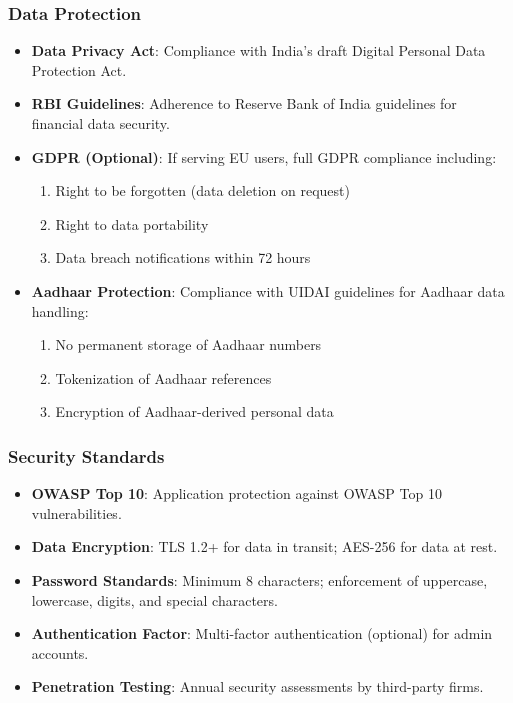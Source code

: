 \subsubsection{Data Protection}
\begin{itemize}
    \item \textbf{Data Privacy Act}: Compliance with India's draft Digital Personal Data Protection Act.
    \item \textbf{RBI Guidelines}: Adherence to Reserve Bank of India guidelines for financial data security.
    \item \textbf{GDPR (Optional)}: If serving EU users, full GDPR compliance including:
    \begin{enumerate}
        \item Right to be forgotten (data deletion on request)
        \item Right to data portability
        \item Data breach notifications within 72 hours
    \end{enumerate}
    \item \textbf{Aadhaar Protection}: Compliance with UIDAI guidelines for Aadhaar data handling:
    \begin{enumerate}
        \item No permanent storage of Aadhaar numbers
        \item Tokenization of Aadhaar references
        \item Encryption of Aadhaar-derived personal data
    \end{enumerate}
\end{itemize}

\subsubsection{Security Standards}
\begin{itemize}
    \item \textbf{OWASP Top 10}: Application protection against OWASP Top 10 vulnerabilities.
    \item \textbf{Data Encryption}: TLS 1.2+ for data in transit; AES-256 for data at rest.
    \item \textbf{Password Standards}: Minimum 8 characters; enforcement of uppercase, lowercase, digits, and special characters.
    \item \textbf{Authentication Factor}: Multi-factor authentication (optional) for admin accounts.
    \item \textbf{Penetration Testing}: Annual security assessments by third-party firms.
\end{itemize}

